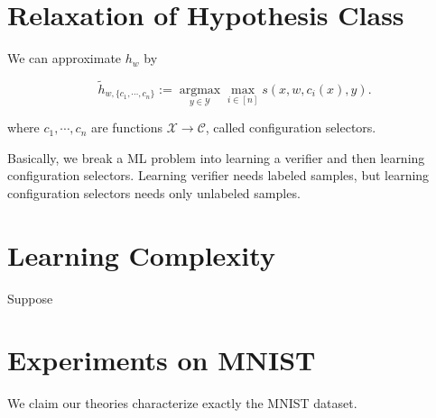 \documentclass[11pt, oneside]{article}   	%
\theoremstyle{definition}
\begin{document}
\section{Relaxation of Hypothesis Class}

We can approximate $h_w$ by

\begin{equation}
	\tilde h_{w,\{c_1,\cdots,c_n\}}:=\mathop{\text{argmax}}\limits_{y\in \mathcal{Y}}\max_{i\in [n]} s(x, w, c_i(x), y).
\end{equation}

where $c_1,\cdots,c_n$ are functions $\mathcal{X}\to \mathcal{C}$, called configuration selectors.

Basically, we break a ML problem into learning a verifier and then learning configuration selectors. Learning verifier needs labeled samples, but learning configuration selectors needs only unlabeled samples.

\section{Learning Complexity}

Suppose

\section{Experiments on MNIST}


 We claim our theories characterize exactly the MNIST dataset.
\end{document}
